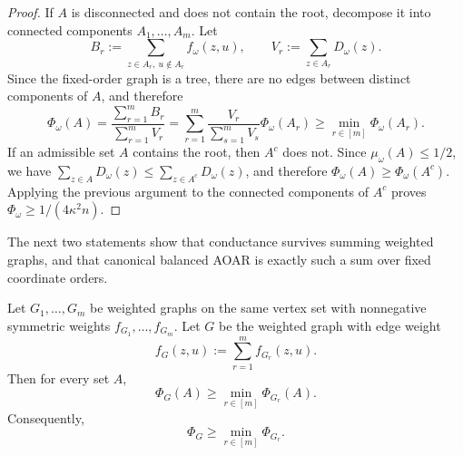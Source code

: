 \documentclass{article}
\numberwithin{theorem}{section}
\numberwithin{proposition}{section}
\numberwithin{corollary}{section}
\numberwithin{lemma}{section}
\numberwithin{conjecture}{section}
\numberwithin{remark}{section}
\numberwithin{definition}{section}
\numberwithin{assumption}{section}
\numberwithin{example}{section}
\newcommand{\lbra}[1]{\left[#1\right]}
\begin{document}
\begin{proof}
If $A$ is disconnected and does not contain the root, decompose it into connected components $A_1,\dots,A_m$. Let
\begin{equation*}
    B_r:=\sum_{z\in A_r,\ u\notin A_r}f_\omega(z,u), \qquad V_r:=\sum_{z\in A_r}D_\omega(z).
\end{equation*}
Since the fixed-order graph is a tree, there are no edges between distinct components of $A$, and therefore
\begin{equation*}
    \Phi_\omega(A)=\frac{\sum_{r=1}^m B_r}{\sum_{r=1}^m V_r}=\sum_{r=1}^m \frac{V_r}{\sum_{s=1}^m V_s}\Phi_\omega(A_r)\ge \min_{r\in\lbra{m}}\Phi_\omega(A_r).
\end{equation*}
If an admissible set $A$ contains the root, then $A^c$ does not. Since $\mu_\omega(A)\le 1/2$, we have $\sum_{z\in A}D_\omega(z)\le \sum_{z\in A^c}D_\omega(z)$, and therefore $\Phi_\omega(A)\ge \Phi_\omega(A^c)$. Applying the previous argument to the connected components of $A^c$ proves $\Phi_\omega\ge 1/(4\kappa^2 n)$.
\end{proof}

The next two statements show that conductance survives summing weighted graphs, and that canonical balanced AOAR is exactly such a sum over fixed coordinate orders.

\begin{lemma}
\label{lem:sum_graph_conductance}
Let $G_1,\dots,G_m$ be weighted graphs on the same vertex set with nonnegative symmetric weights $f_{G_1},\dots,f_{G_m}$. Let $G$ be the weighted graph with edge weight
\begin{equation*}
    f_G(z,u) := \sum_{r=1}^m f_{G_r}(z,u).
\end{equation*}
Then for every set $A$,
\begin{equation*}
    \Phi_G(A) \ge \min_{r\in\lbra{m}}\Phi_{G_r}(A).
\end{equation*}
Consequently,
\begin{equation*}
    \Phi_G \ge \min_{r\in\lbra{m}}\Phi_{G_r}.
\end{equation*}
\end{lemma}
\end{document}
